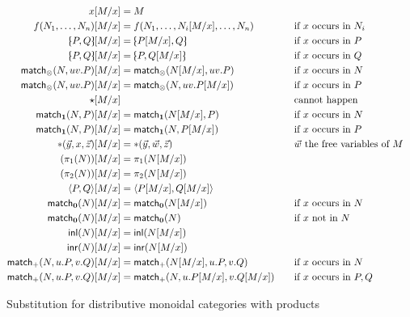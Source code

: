 \begin{figure}
  \centering
  \begin{alignat*}{2}
    x[M/x] &= M\\
    f(N_1,\dots,N_n)[M/x] &= f(N_1,\dots,N_i[M/x],\dots,N_n) &&\quad\text{if $x$ occurs in $N_i$}\\
    \tpair P Q[M/x] &= \tpair{P[M/x]}{Q} &&\quad\text{if $x$ occurs in $P$}\\
    \tpair P Q[M/x] &= \tpair{P}{Q[M/x]} &&\quad\text{if $x$ occurs in $Q$}\\
    \match_\tensor(N,uv.P)[M/x] &= \match_\tensor(N[M/x],uv.P) &&\quad\text{if $x$ occurs in $N$}\\
    \match_\tensor(N,uv.P)[M/x] &= \match_\tensor(N,uv.P[M/x]) &&\quad\text{if $x$ occurs in $P$}\\
    \ott[M/x] &&&\quad\text{cannot happen}\\
    \match_\one(N,P)[M/x] &= \match_\one(N[M/x],P) &&\quad\text{if $x$ occurs in $N$}\\
    \match_\one(N,P)[M/x] &= \match_\one(N,P[M/x]) &&\quad\text{if $x$ occurs in $P$}\\
    \ttt(\vec y,x,\vec z)[M/x] &= \ttt(\vec y,\vec w, \vec z) &&\quad\text{$\vec w$ the free variables of $M$}\\
    (\pi_1(N))[M/x] &= \pi_1(N[M/x])\\
    (\pi_2(N))[M/x] &= \pi_2(N[M/x])\\
    \pair{P}{Q}[M/x] &= \pair{P[M/x]}{Q[M/x]}\\
    \abort(N)[M/x] &= \abort(N[M/x]) &&\quad\text{if $x$ occurs in $N$}\\
    \abort(N)[M/x] &= \abort(N) &&\quad\text{if $x$ not in $N$}\\
    \inl(N)[M/x] &= \inl(N[M/x])\\
    \inr(N)[M/x] &= \inr(N[M/x])\\
    \case(N,u.P,v.Q)[M/x] &= \case(N[M/x],u.P,v.Q) &&\quad\text{if $x$ occurs in $N$}\\
    \case(N,u.P,v.Q)[M/x] &= \case(N,u.P[M/x],v.Q[M/x]) &&\quad\text{if $x$ occurs in $P,Q$}
  \end{alignat*}
  \caption{Substitution for distributive monoidal categories with products}
  \label{fig:moncat-prod-coprod-sub}
\end{figure}

